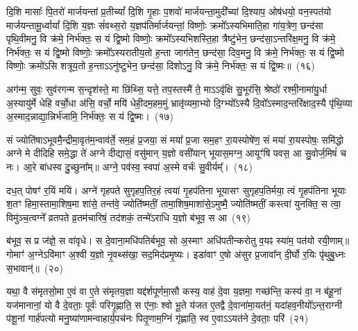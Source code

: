दि॒शि मासाः᳚ पि॒तरो॑ मार्जयन्तां प्र॒तीच्यां᳚ दि॒शि गृ॒हाः प॒शवो॑ मार्जयन्ता॒मुदी᳚च्यां दि॒श्याप॒ ओष॑धयो॒ वन॒स्पत॑यो मार्जयन्तामू॒र्ध्वायां᳚ दि॒शि य॒ज्ञः सं॑वथ्स॒रो य॒ज्ञप॑तिर्मार्जयन्तां॒ विष्णोः॒ क्रमो᳚\-ऽस्यभिमाति॒हा गा॑य॒त्रेण॒ छन्द॑सा पृथि॒वीमनु॒ वि क्र॑मे॒ निर्भ॑क्तः॒ स यं द्वि॒ष्मो विष्णोः॒ क्रमो᳚\-ऽस्यभिशस्ति॒हा त्रैष्टु॑भेन॒ छन्द॑सा॒\-ऽन्तरि॑क्ष॒मनु॒ वि क्र॑मे॒ निर्भ॑क्तः॒ स यं द्वि॒ष्मो विष्णोः॒ क्रमो᳚\-ऽस्यरातीय॒तो ह॒न्ता जाग॑तेन॒ छन्द॑सा॒ दिव॒मनु॒ वि क्र॑मे॒ निर्भ॑क्तः॒ स यं द्वि॒ष्मो विष्णोः॒ क्रमो॑\-ऽसि शत्रूय॒तो ह॒न्ता\-ऽऽ\-नु॑ष्टुभेन॒ छन्द॑सा॒ दिशो\-ऽनु॒ वि क्र॑मे॒ निर्भ॑क्तः॒ स यं द्वि॒ष्मः॥~(१६)\ip

{\anuvakamend[{दक्षि॑णायां द्वि॒ष्मो विष्णो॒रेका॒न्नत्रि॒ꣳ॒शच्च॑}]}

अग॑न्म॒ सुवः॒ सुव॑रगन्म स॒न्दृश॑स्ते॒ मा छि॑थ्सि॒ यत्ते॒ तप॒स्तस्मै॑ ते॒ मा\-ऽऽ\-वृ॑क्षि सु॒भूर॑सि॒ श्रेष्ठो॑ रश्मी॒नामा॑यु॒र्धा अ॒स्यायु॑र्मे धेहि वर्चो॒धा अ॑सि॒ वर्चो॒ मयि॑ धेही॒दम॒हम॒मुं भ्रातृ॑व्यमा॒भ्यो दि॒ग्भ्यो᳚\-ऽस्यै दि॒वो᳚\-ऽस्माद॒न्तरि॑क्षाद॒स्यै पृ॑थि॒व्या अ॒स्मा\-द॒न्नाद्या॒न्निर्भ॑जामि॒ निर्भ॑क्तः॒ स यं द्वि॒ष्मः।~(१७)\ip

सं ज्योति॑षा\-ऽभूवमै॒न्द्रीमा॒वृत॑\-म॒न्वाव॑र्ते॒ सम॒हं प्र॒जया॒ सं मया᳚ प्र॒जा सम॒हꣳ रा॒यस्पोषे॑ण॒ सं मया॑ रा॒यस्पोषः॒ समि॑द्धो अग्ने मे दीदिहि समे॒द्धा ते॑ अग्ने दीद्यासं॒ वसु॑मान् य॒ज्ञो वसी॑यान् भूयास॒मग्न॒ आयूꣳ॑षि पवस॒ आ सु॒वोर्ज॒मिषं॑ च नः। आ॒रे बा॑धस्व दु॒च्छुना᳚म्॥ अग्ने॒ पव॑स्व॒ स्वपा॑ अ॒स्मे वर्चः॑ सु॒वीर्यम्᳚।~(१८)\ip

दध॒त् पोषꣳ॑ र॒यिं मयि॑। अग्ने॑ गृहपते सुगृहप॒तिर॒हं त्वया॑ गृ॒हप॑तिना भूयासꣳ सुगृहप॒तिर्मया॒ त्वं गृ॒हप॑तिना भूयाः श॒तꣳ हिमा॒स्तामा॒शिष॒मा शा॑से॒ तन्त॑वे॒ ज्योति॑ष्मतीं॒ तामा॒शिष॒माशा॑से॒\-ऽमुष्मै॒ ज्योति॑ष्मतीं॒ कस्त्वा॑ युनक्ति॒ स त्वा॒ विमु॑ञ्च॒त्वग्ने᳚ व्रतपते व्र॒तम॑चारिषं॒ तद॑शकं॒ तन्मे॑\-ऽराधि य॒ज्ञो ब॑भूव॒ स आ~(१९)\ip

ब॑भूव॒ स प्र ज॑ज्ञे॒ स वा॑वृधे। स दे॒वाना॒मधि॑\-पतिर्बभूव॒ सो अ॒स्माꣳ अधि॑पतीन्करोतु व॒यꣴ स्या॑म॒ पत॑यो रयी॒णाम्॥ गोमाꣳ॑ अ॒ग्ने\-ऽवि॑माꣳ अ॒श्वी य॒ज्ञो नृ॒वथ्स॑खा॒ सद॒मिद॑प्रमृ॒ष्यः। इडा॑वाꣳ ए॒षो अ॑सुर प्र॒जावा᳚न् दी॒र्घो र॒यिः पृ॑थुबु॒ध्नः स॒भावान्॑॥~(२०)\ip

{\anuvakamend[{द्वि॒ष्मः सु॒वीर्य॒ꣳ॒ स आ पञ्च॑त्रिꣳशच्च}]}

यथा॒ वै स॑मृतसो॒मा ए॒वं वा ए॒ते स॑मृतय॒ज्ञा यद्द॑र्\mbox{}श\-पूर्ण\-मा॒सौ कस्य॒ वाह॑ दे॒वा य॒ज्ञमा॒ गच्छ॑न्ति॒ कस्य॑ वा॒ न ब॑हू॒नां यज॑मानानां॒ यो वै दे॒वताः॒ पूर्वः॑ परिगृ॒ह्णाति॒ स ए॑नाः॒ श्वो भू॒ते य॑जत ए॒तद्वै दे॒वाना॑मा॒यत॑नं॒ यदा॑हव॒नीयो᳚\-ऽन्त॒राग्नी प॑शू॒नां गार्\mbox{}ह॑पत्यो मनु॒ष्या॑णामन्वाहार्य॒पच॑नः पितृ॒णाम॒ग्निं गृ॑ह्णाति॒ स्व ए॒वा\-ऽऽयत॑ने दे॒वताः॒ परि॑~(२१)\ip


